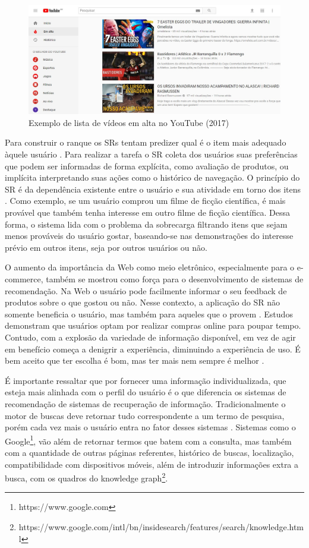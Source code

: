 \begin{figure}
	\centering
	\includegraphics[scale=0.50]{imagens/youtube.jpg}
	\caption{Exemplo de lista de vídeos em alta no YouTube (2017)}
	\label{fig:youtube_em_alta}
\end{figure} 

Para construir o ranque os SRs tentam predizer qual é o item mais adequado àquele usuário \citep{Ricci2011}. Para realizar a tarefa o SR coleta dos usuários suas preferências que podem ser informadas de forma explícita, como avaliação de produtos, ou implícita interpretando suas ações como o histórico de navegação. O princípio do SR é da dependência existente entre o usuário e sua atividade em torno dos itens \citep{Aggarwal:Intro:2016}. Como exemplo, se um usuário comprou um filme de ficção científica, é mais provável que também tenha interesse em outro filme de ficção científica. Dessa forma, o sistema lida com o problema da sobrecarga filtrando itens que sejam menos prováveis do usuário gostar, baseando-se nas demonstrações do interesse prévio em outros itens, seja por outros usuários ou não.

O aumento da importância da Web como meio eletrônico, especialmente para o e-commerce, também se mostrou como força para o desenvolvimento de sistemas de recomendação.  Na Web o usuário pode facilmente informar o seu feedback de produtos sobre o que gostou ou não. Nesse contexto, a aplicação do SR não somente beneficia o usuário, mas também para aqueles que o provem \citep{ ISINKAYE2015261}. Estudos \citep{Mykolas:2015a} demonstram que usuários optam por realizar compras online para poupar tempo. Contudo, com a explosão da variedade de informação disponível, em vez de agir em benefício começa a denigrir a experiência, diminuindo a experiência de uso. É bem aceito que ter escolha é bom, mas ter mais nem sempre é melhor \citep{Ricci2011}.

É importante ressaltar que por fornecer uma informação individualizada, que esteja mais alinhada com o perfil do usuário é o que diferencia os sistemas de recomendação de sistemas de recuperação de informação. Tradicionalmente o motor de buscas deve retornar tudo correspondente a um termo de pesquisa, porém cada vez mais o usuário entra no fator desses sistemas \citep{Burke:2002:HRS:586321.586352}. Sistemas como o Google\footnote{https://www.google.com}, vão além de retornar termos que batem com a consulta, mas também com a quantidade de outras páginas referentes, histórico de buscas, localização, compatibilidade com dispositivos móveis, além de introduzir informações extra a busca, com os quadros do knowledge graph\footnote{ https://www.google.com/intl/bn/insidesearch/features/search/knowledge.html}.

